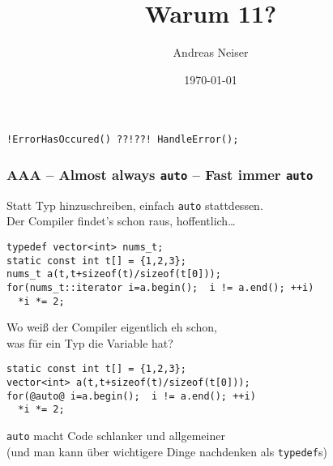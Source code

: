 \documentclass[t,ngerman,usepdftitle=false]{beamer}
\author{Andreas Neiser}
\title{Warum \Cpp{}11?}
\date{\today}
\begin{document}
\begin{frame}[fragile]
  
    \maketitle
  
  \begin{center}
    \lstinline|!ErrorHasOccured() ??!??! HandleError();|
  \end{center}
\end{frame}


\begin{frame}[fragile]
  \frametitle{AAA -- Almost always \lstinline!auto! -- Fast immer \lstinline!auto! }
  Statt Typ hinzuschreiben, einfach \lstinline!auto! stattdessen. \\ Der Compiler findet's schon raus, hoffentlich\ldots
  
\begin{lstlisting}
typedef vector<int> nums_t; 
static const int t[] = {1,2,3};
nums_t a(t,t+sizeof(t)/sizeof(t[0])); 
for(nums_t::iterator i=a.begin();  i != a.end(); ++i)
  *i *= 2;
\end{lstlisting}

Wo weiß der Compiler eigentlich eh schon, \\ was für ein Typ die Variable hat?

\pause 
\begin{lstlisting}
static const int t[] = {1,2,3};
vector<int> a(t,t+sizeof(t)/sizeof(t[0])); 
for(@auto@ i=a.begin();  i != a.end(); ++i)
  *i *= 2;
\end{lstlisting}

\pause 
\begin{block}{}
  \centering
  \lstinline!auto! macht Code schlanker und allgemeiner\\ \small (und man kann über wichtigere Dinge nachdenken als \lstinline|typedef|s) 
\end{block}
  
\end{frame}
\end{document}
